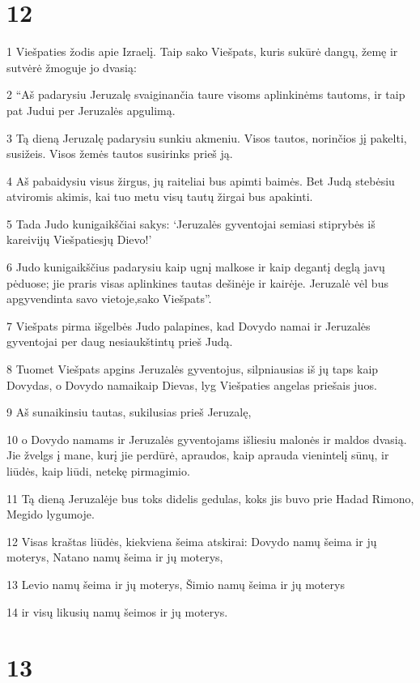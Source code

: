\chapter{12}


\par 1 Viešpaties žodis apie Izraelį. Taip sako Viešpats, kuris sukūrė dangų, žemę ir sutvėrė žmoguje jo dvasią: 
\par 2 “Aš padarysiu Jeruzalę svaiginančia taure visoms aplinkinėms tautoms, ir taip pat Judui per Jeruzalės apgulimą. 
\par 3 Tą dieną Jeruzalę padarysiu sunkiu akmeniu. Visos tautos, norinčios jį pakelti, susižeis. Visos žemės tautos susirinks prieš ją. 
\par 4 Aš pabaidysiu visus žirgus, jų raiteliai bus apimti baimės. Bet Judą stebėsiu atviromis akimis, kai tuo metu visų tautų žirgai bus apakinti. 
\par 5 Tada Judo kunigaikščiai sakys: ‘Jeruzalės gyventojai semiasi stiprybės iš kareivijų Viešpaties­jų Dievo!’ 
\par 6 Judo kunigaikščius padarysiu kaip ugnį malkose ir kaip degantį deglą javų pėduose; jie praris visas aplinkines tautas dešinėje ir kairėje. Jeruzalė vėl bus apgyvendinta savo vietoje,­sako Viešpats”. 
\par 7 Viešpats pirma išgelbės Judo palapines, kad Dovydo namai ir Jeruzalės gyventojai per daug nesiaukštintų prieš Judą. 
\par 8 Tuomet Viešpats apgins Jeruzalės gyventojus, silpniausias iš jų taps kaip Dovydas, o Dovydo namai­kaip Dievas, lyg Viešpaties angelas priešais juos. 
\par 9 Aš sunaikinsiu tautas, sukilusias prieš Jeruzalę, 
\par 10 o Dovydo namams ir Jeruzalės gyventojams išliesiu malonės ir maldos dvasią. Jie žvelgs į mane, kurį jie perdūrė, apraudos, kaip aprauda vienintelį sūnų, ir liūdės, kaip liūdi, netekę pirmagimio. 
\par 11 Tą dieną Jeruzalėje bus toks didelis gedulas, koks jis buvo prie Hadad Rimono, Megido lygumoje. 
\par 12 Visas kraštas liūdės, kiekviena šeima atskirai: Dovydo namų šeima ir jų moterys, Natano namų šeima ir jų moterys, 
\par 13 Levio namų šeima ir jų moterys, Šimio namų šeima ir jų moterys 
\par 14 ir visų likusių namų šeimos ir jų moterys.



\chapter{13}


